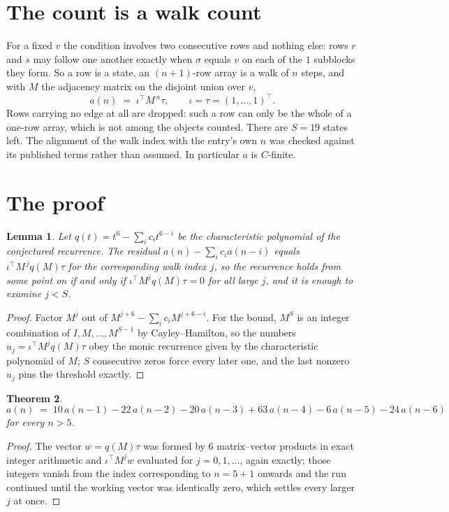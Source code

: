 \documentclass[11pt,a4paper]{article}
\theoremstyle{plain}
\newtheorem{theorem}{Theorem}
\newtheorem{lemma}[theorem]{Lemma}
\theoremstyle{definition}
\begin{document}
\section{The count is a walk count}

For a fixed $v$ the condition involves two consecutive rows and nothing
else: rows $r$ and $s$ may follow one another exactly when $\sigma$ equals $v$ on each of the
$1$ subblocks they form. So a row is a state, an $(n+1)$-row array is a walk of $n$
steps, and with $M$ the adjacency matrix on the disjoint union over $v$,
\[
a(n)\;=\;\iota^{\!\top}M^{\,n}\tau,\qquad\iota=\tau=(1,\dots,1)^{\!\top} .
\]
Rows carrying no edge at all are dropped: such a row can only be the whole of a one-row
array, which is not among the objects counted. There are $S=19$ states left.
The alignment of the walk index with the entry's own $n$ was checked against its published
terms rather than assumed. In particular $a$ is $C$-finite.

\section{The proof}

\begin{lemma}\label{lem:crit}
Let $q(t)=t^{6}-\sum_i c_it^{6-i}$ be the characteristic polynomial of the
conjectured recurrence. The residual $a(n)-\sum_ic_ia(n-i)$ equals
$\iota^{\!\top}M^{\,j}q(M)\tau$ for the corresponding walk index $j$, so the recurrence
holds from some point on if and only if $\iota^{\!\top}M^{j}q(M)\tau=0$ for all large $j$,
and it is enough to examine $j<S$.
\end{lemma}

\begin{proof}
Factor $M^{j}$ out of $M^{j+6}-\sum_ic_iM^{j+6-i}$. For the bound, $M^{S}$
is an integer combination of $I,M,\dots,M^{S-1}$ by Cayley--Hamilton, so the numbers
$u_j=\iota^{\!\top}M^{j}q(M)\tau$ obey the monic recurrence given by the characteristic
polynomial of $M$; $S$ consecutive zeros force every later one, and the last nonzero $u_j$
pins the threshold exactly.
\end{proof}

\begin{theorem}
\[
a(n)\;=\;10\,a(n-1) - 22\,a(n-2) - 20\,a(n-3) + 63\,a(n-4) - 6\,a(n-5) - 24\,a(n-6)
\]
for every $n>5$.
\end{theorem}

\begin{proof}
The vector $w=q(M)\tau$ was formed by $6$ matrix--vector products in exact integer
arithmetic and $\iota^{\!\top}M^{j}w$ evaluated for $j=0,1,\dots$, again exactly; those
integers vanish from the index corresponding to $n=5+1$ onwards and the run continued
until the working vector was identically zero, which settles every larger $j$ at once.
\end{proof}
\end{document}
